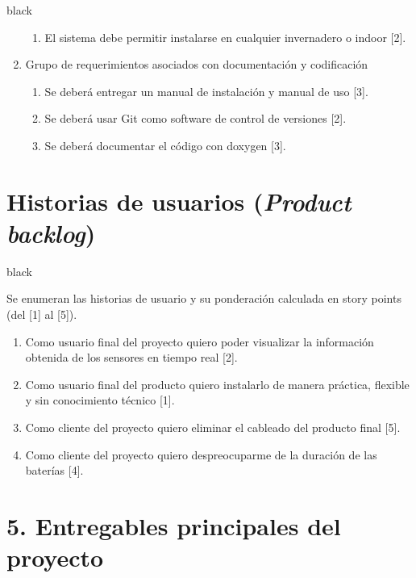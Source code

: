 \documentclass[11pt]{charter}
\begin{document}
\begin{consigna}{black}
\begin{enumerate}
\begin{enumerate}
	\item El sistema debe permitir instalarse en cualquier invernadero o indoor [2].
	\end{enumerate}
\item Grupo de requerimientos asociados con documentación y codificación
	\begin{enumerate}
	\item Se deberá entregar un manual de instalación y manual de uso [3].
	\item Se deberá usar Git como software de control de versiones [2].
	\item Se deberá documentar el código con doxygen [3].
	\end{enumerate}


\end{enumerate}

\end{consigna}

\section{Historias de usuarios (\textit{Product backlog})}
\label{sec:backlog}

\begin{consigna}{black}

Se enumeran las historias de usuario y su ponderación calculada en story points (del [1] al [5]).

\begin{enumerate}
\item Como usuario final del proyecto quiero poder visualizar la información obtenida de los sensores en tiempo real [2].

\item Como usuario final del producto quiero instalarlo de manera práctica, flexible y sin conocimiento técnico [1].

\item Como cliente del proyecto quiero eliminar el cableado del producto final [5].

\item Como cliente del proyecto quiero despreocuparme de la duración de las baterías [4].

\end{enumerate}


\end{consigna}

\section{5. Entregables principales del proyecto}
\label{sec:entregables}
\end{document}
